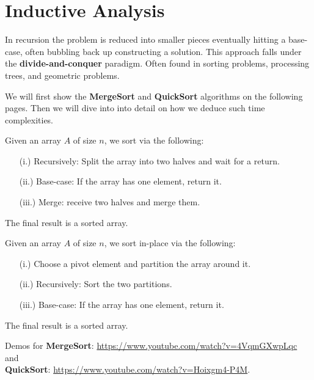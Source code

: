 \vspace{-2em}
\section{Inductive Analysis}

In recursion the problem is reduced into smaller pieces eventually
hitting a base-case, often bubbling back up constructing a solution.
This approach falls under the \textbf{divide-and-conquer} paradigm. Often 
found in sorting problems, processing trees, and
geometric problems.

We will first show the \textbf{MergeSort} and \textbf{QuickSort} algorithms on the following pages. Then we will dive into 
into detail on how we deduce such time complexities.

\begin{theo}[MergeSort]
    
    Given an array $A$ of size $n$, we sort via the following:
    \begin{enumerate}
        \item [(i.)] Recursively: Split the array into two halves and wait for a return.
        \item [(ii.)] Base-case: If the array has one element, return it.
        \item [(iii.)] Merge: receive two halves and merge them.
    \end{enumerate}
    The final result is a sorted array.
\end{theo}

\begin{theo}[QuickSort]

    Given an array $A$ of size $n$, we sort in-place via the following:
    \begin{enumerate}
        \item [(i.)] Choose a pivot element and partition the array around it.
        \item [(ii.)] Recursively: Sort the two partitions.
        \item [(iii.)] Base-case: If the array has one element, return it.
    \end{enumerate}
    The final result is a sorted array.
\end{theo}

\begin{Tip}
Demos for \textbf{MergeSort}: \url{https://www.youtube.com/watch?v=4VqmGXwpLqc} and\\
 \textbf{QuickSort}: \url{https://www.youtube.com/watch?v=Hoixgm4-P4M}.
\end{Tip}

